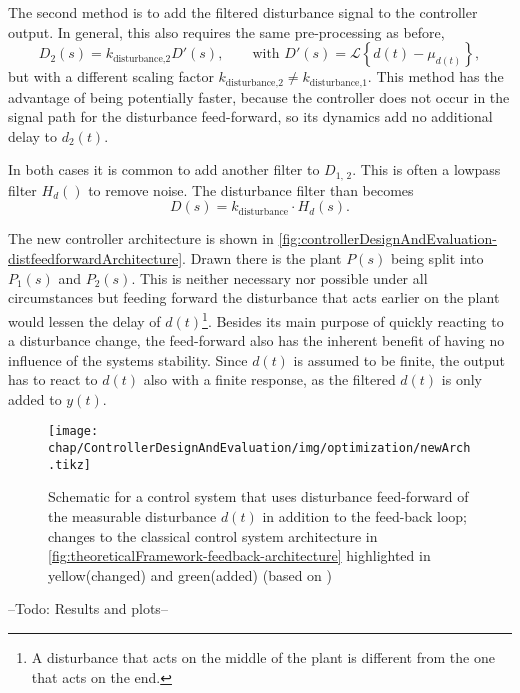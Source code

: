 The second method is to add the filtered disturbance signal to the controller output. \cite{Foellinger2016,electronics7100223} In general, this also requires the same pre-processing as before,
\begin{equation}
D_2(s)=k_\text{disturbance,2} D'(s),\qquad \text{with } D'(s)=\mathcal{L}\left\{d(t)-\mu_{d(t)}\right\},
\end{equation}
but with a different scaling factor $k_\text{disturbance,2} \neq k_\text{disturbance,1}$. This method has the advantage of being potentially faster, because the controller does not occur in the signal path for the disturbance feed-forward, so its dynamics add no additional delay to $d_2(t)$.

In both cases it is common to add another filter to $D_{1,\,2}$. This is often a lowpass filter $H_d()$ to remove noise. The disturbance filter than becomes
\begin{equation}
D(s) = k_\text{disturbance} \cdot H_d(s).
\end{equation}

The new controller architecture is shown in \autoref{fig:controllerDesignAndEvaluation-distfeedforwardArchitecture}. Drawn there is the plant $P(s)$ being split into $P_1(s)$ and $P_2(s)$. This is neither necessary nor possible under all circumstances but feeding forward the disturbance that acts earlier on the plant would lessen the delay of $d(t)$\footnote{A disturbance that acts on the middle of the plant is different from the one that acts on the end.}. Besides its main purpose of quickly reacting to a disturbance change, the feed-forward also has the inherent benefit of having no influence of the systems stability. Since $d(t)$ is assumed to be finite, the output has to react to $d(t)$ also with a finite response, as the filtered $d(t)$ is only added to $y(t)$.

\begin{figure}[tb]
	\centering
	\texttt{[image: chap/ControllerDesignAndEvaluation/img/optimization/newArch.tikz]}
	\caption{Schematic for a control system that uses disturbance feed-forward of the measurable disturbance $d(t)$ in addition to the feed-back loop; changes to the classical control system architecture in \autoref{fig:theoreticalFramework-feedback-architecture} highlighted in yellow(changed) and green(added) (based on \cite[p.~221]{Foellinger2016})}
	\label{fig:controllerDesignAndEvaluation-distfeedforwardArchitecture}
\end{figure}

--Todo: Results and plots--


